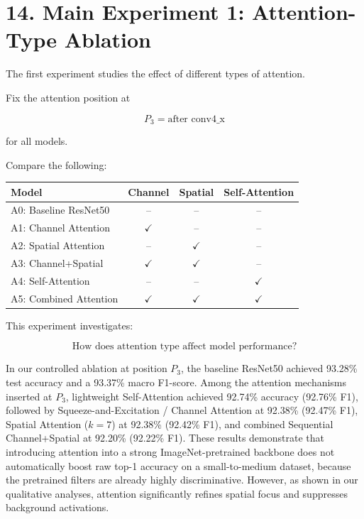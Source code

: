 \documentclass[10pt]{article}
\begin{document}
\section*{14. Main Experiment 1: Attention-Type Ablation}

The first experiment studies the effect of different types of attention.

Fix the attention position at

\[
\boxed{
P_3=\text{after conv4\_x}
}
\]

for all models.

Compare the following:

\begin{center}

\begin{tabular}{|l|c|c|c|}
\hline

\textbf{Model}
&
\textbf{Channel}
&
\textbf{Spatial}
&
\textbf{Self-Attention}
\\
\hline

A0: Baseline ResNet50
&
--
&
--
&
--
\\
\hline

A1: Channel Attention
&
$\checkmark$
&
--
&
--
\\
\hline

A2: Spatial Attention
&
--
&
$\checkmark$
&
--
\\
\hline

A3: Channel+Spatial
&
$\checkmark$
&
$\checkmark$
&
--
\\
\hline

A4: Self-Attention
&
--
&
--
&
$\checkmark$
\\
\hline

A5: Combined Attention
&
$\checkmark$
&
$\checkmark$
&
$\checkmark$
\\
\hline

\end{tabular}

\end{center}

This experiment investigates:

\[
\boxed{
\text{How does attention type affect model performance?}
}
\]

In our controlled ablation at position $P_3$, the baseline ResNet50 achieved 93.28\% test accuracy and a 93.37\% macro F1-score. Among the attention mechanisms inserted at $P_3$, lightweight Self-Attention achieved 92.74\% accuracy (92.76\% F1), followed by Squeeze-and-Excitation / Channel Attention at 92.38\% (92.47\% F1), Spatial Attention ($k=7$) at 92.38\% (92.42\% F1), and combined Sequential Channel+Spatial at 92.20\% (92.22\% F1). These results demonstrate that introducing attention into a strong ImageNet-pretrained backbone does not automatically boost raw top-1 accuracy on a small-to-medium dataset, because the pretrained filters are already highly discriminative. However, as shown in our qualitative analyses, attention significantly refines spatial focus and suppresses background activations.
\end{document}
